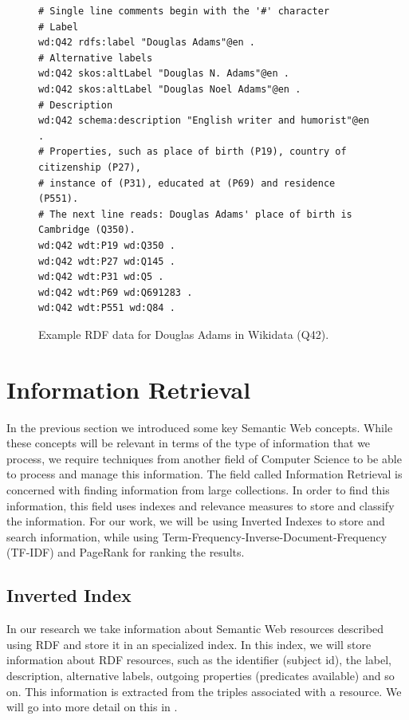 \begin{figure}[H]
\begin{verbatim}
# Single line comments begin with the '#' character
# Label
wd:Q42 rdfs:label "Douglas Adams"@en . 
# Alternative labels
wd:Q42 skos:altLabel "Douglas N. Adams"@en .
wd:Q42 skos:altLabel "Douglas Noel Adams"@en .
# Description
wd:Q42 schema:description "English writer and humorist"@en .
# Properties, such as place of birth (P19), country of citizenship (P27), 
# instance of (P31), educated at (P69) and residence (P551).
# The next line reads: Douglas Adams' place of birth is Cambridge (Q350).
wd:Q42 wdt:P19 wd:Q350 .
wd:Q42 wdt:P27 wd:Q145 .
wd:Q42 wdt:P31 wd:Q5 .
wd:Q42 wdt:P69 wd:Q691283 .
wd:Q42 wdt:P551 wd:Q84 .
\end{verbatim}
\caption{Example RDF data for Douglas Adams in Wikidata (Q42).}
\label{fig:rdfDataExample}
\end{figure}


\section{Information Retrieval}

In the previous section we introduced some key Semantic Web concepts. While these concepts will be relevant in terms of the type of information that we process, we require techniques from another field of Computer Science to  be able to process and manage this information. The field called Information Retrieval is concerned with finding information from large collections. In order to find this information, this field uses indexes and relevance measures to store and classify the information. For our work, we will be using Inverted Indexes to store and search information, while using Term-Frequency-Inverse-Document-Frequency (TF-IDF) and PageRank for ranking the results.

\subsection{Inverted Index}
\label{chap:lucene}

In our research we take information about Semantic Web resources described using RDF and store it in an specialized index. In this index, we will store information about RDF resources, such as the identifier (subject id), the label, description, alternative labels, outgoing properties (predicates available) and so on. This information is extracted from the triples associated with a resource. We will go into more detail on this in .

